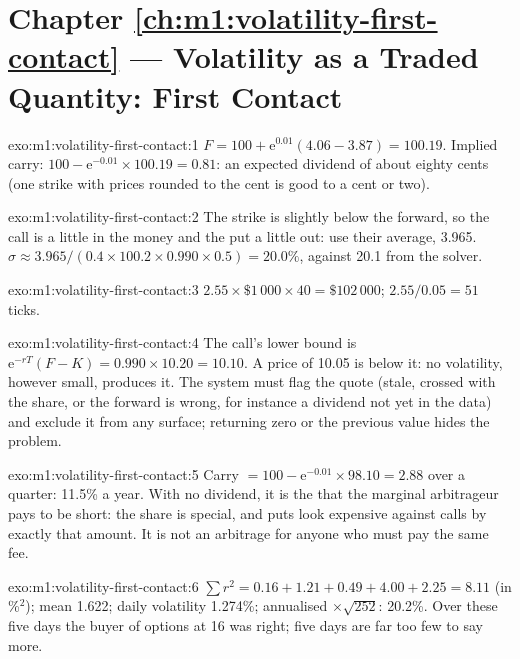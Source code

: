\section*{Chapter \ref{ch:m1:volatility-first-contact} --- Volatility as a Traded Quantity: First Contact}

\begin{solution}{exo:m1:volatility-first-contact:1}
$F = 100 + \mathrm{e}^{0.01}(4.06 - 3.87) = 100.19$. Implied carry: $100 -
\mathrm{e}^{-0.01} \times 100.19 = 0.81$: an expected dividend of about eighty
cents (one strike with prices rounded to the cent is good to a cent or two).
\end{solution}

\begin{solution}{exo:m1:volatility-first-contact:2}
The strike is slightly below the forward, so the call is a little in the
money and the put a little out: use their average, 3.965. $\sigma \approx
3.965/(0.4 \times 100.2 \times 0.990 \times 0.5) = 20.0\%$, against 20.1 from
the solver.
\end{solution}

\begin{solution}{exo:m1:volatility-first-contact:3}
$2.55 \times \$1\,000 \times 40 = \$102\,000$; $2.55/0.05 = 51$ ticks.
\end{solution}

\begin{solution}{exo:m1:volatility-first-contact:4}
The call's lower bound is $\mathrm{e}^{-rT}(F - K) = 0.990 \times 10.20 =
10.10$. A price of 10.05 is below it: no volatility, however small, produces
it. The system must flag the quote (stale, crossed with the share, or the
forward is wrong, for instance a dividend not yet in the data) and exclude it
from any surface; returning zero or the previous value hides the problem.
\end{solution}

\begin{solution}{exo:m1:volatility-first-contact:5}
Carry $= 100 - \mathrm{e}^{-0.01} \times 98.10 = 2.88$ over a quarter: 11.5\% a
year. With no dividend, it is the  that the marginal arbitrageur
pays to be short: the share is special, and puts look expensive against
calls by exactly that amount. It is not an arbitrage for anyone who must pay
the same fee.
\end{solution}

\begin{solution}{exo:m1:volatility-first-contact:6}
$\sum r^2 = 0.16 + 1.21 + 0.49 + 4.00 + 2.25 = 8.11$ (in \%$^2$); mean 1.622;
daily volatility 1.274\%; annualised $\times\sqrt{252}$: 20.2\%. Over these
five days the buyer of options at 16 was right; five days are far too few to
say more.
\end{solution}

